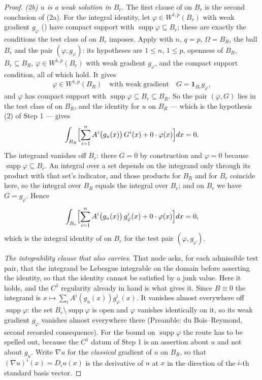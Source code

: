 \begin{proof}
\emph{(2b) $u$ is a weak solution in $B_r$.}  The first clause of
 on $B_r$ is the second conclusion of (2a).  For the
integral identity, let $\varphi\in W^{1,p}(B_r)$ with weak gradient $g_\varphi$
() have compact support with
$\operatorname{supp}\varphi\subseteq B_r$; these are exactly the conditions the
test class of  on $B_r$ imposes.  Apply
 with $n$, $q=p$, $\Omega=B_R$, the ball $B_r$
and the pair $(\varphi,g_\varphi)$: its hypotheses are $1\le n$, $1\le p$,
openness of $B_R$, $B_r\subseteq B_R$, $\varphi\in W^{1,p}(B_r)$ with weak
gradient $g_\varphi$, and the compact support condition, all of which hold.  It
gives
\[
\varphi\in W^{1,p}(B_R)\quad\text{with weak gradient}\quad
G=\mathbf1_{B_r}g_\varphi ,
\]
and $\varphi$ has compact support with
$\operatorname{supp}\varphi\subseteq B_r\subseteq B_R$.  So the pair
$(\varphi,G)$ lies in the test class of  on $B_R$,
and the identity for $u$ on $B_R$ --- which is the hypothesis (2) of Step 1 ---
gives
\[
\int_{B_R}\Bigl[\sum_{i=1}^n A^i\bigl(g_u(x)\bigr)\,G^i(x)+0\cdot\varphi(x)\Bigr]dx=0 .
\]
The integrand vanishes off $B_r$: there $G=0$ by construction and $\varphi=0$
because $\operatorname{supp}\varphi\subseteq B_r$.  An integral over a set
depends on the integrand only through its product with that set's indicator, and
those products for $B_R$ and for $B_r$ coincide here, so the integral over $B_R$
equals the integral over $B_r$; and on $B_r$ we have $G=g_\varphi$.  Hence
\[
\int_{B_r}\Bigl[\sum_{i=1}^n A^i\bigl(g_u(x)\bigr)\,g_\varphi^i(x)+0\cdot\varphi(x)\Bigr]dx=0 ,
\]
which is the integral identity of  on $B_r$ for the
test pair $(\varphi,g_\varphi)$.

\emph{The integrability clause that  also carries.}
That node asks, for each admissible test pair, that the integrand be Lebesgue
integrable on the domain before asserting the identity, so that the identity
cannot be satisfied by a junk value.  Here it holds, and the $C^1$ regularity
already in hand is what gives it.  Since $B\equiv0$ the integrand is
$x\mapsto\sum_iA^i(g_u(x))g_\varphi^i(x)$.  It vanishes almost everywhere off
$\operatorname{supp}\varphi$: the set $B_r\setminus\operatorname{supp}\varphi$ is
open and $\varphi$ vanishes identically on it, so its weak gradient
$g_\varphi$ vanishes almost everywhere there (Preamble: du
Bois--Reymond, second recorded consequence).  For the bound on $\operatorname{supp}\varphi$ the route has to be
spelled out, because the $C^1$ datum of Step 1 is an assertion about $u$ and not
about $g_u$.  Write $\nabla u$ for the \emph{classical} gradient of $u$ on
$B_R$, so that $(\nabla u)^i(x)=D_iu(x)$ is the derivative of $u$ at $x$ in the
direction of the $i$-th standard basis vector.


\end{proof}
